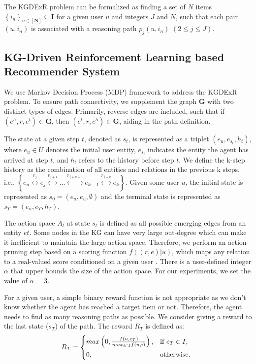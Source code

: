 \documentclass[11pt]{article}
\begin{document}
The KGDExR problem can be formalized as finding a set of $N$ items $\left \{i_{n}\right \}_{n \in [\mathbf{N}]} \subseteq  \mathbf{I}$ for a given user $u$ and integers $J$ and $N$, such that each pair $(u,i_{n})$ is associated with a reasoning path $p_{j}(u,i_{n})$ $(2 \leq j \leq J)$. 

\subsection{KG-Driven Reinforcement Learning based Recommender System}

We use Markov Decision Process (MDP) framework to address the KGDExR problem. To ensure path connectivity, we supplement the graph $\mathbf{G}$ with two distinct types of edges. Primarily, reverse edges are included, such that if $(e^{h},r, e^{t}) \in \mathbf{G}$, then $(e^{t},r, e^{h}) \in \mathbf{G}$, aiding in the path definition.

The state at a given step $t$, denoted as $s_{t}$, is represented as a triplet $(e_{u}, e_{s_{t}}, h_{t})$, where $e_{u} \in U$ denotes the initial user entity, $e_{s_{t}}$ indicates the entity the agent has arrived at step $t$, and $h_{t}$ refers to the history before step $t$. We define the k-step history as the combination of all entities and relations in the previous k steps, i.e., $\left \{ e_{u} \overset{r_{j}}{\leftrightarrow }   e_{j} \overset{r_{j+1}}{\leftrightarrow } . . . \overset{r_{j+k-1}}{\leftrightarrow } e_{k-1} \overset{r_{j+k}}{\leftrightarrow } e_{k} \right \} $. Given some user $u$, the initial state is represented as $s_0 = (e_{u}, e_{u}, \emptyset)$ and the terminal state is represented as  $s_{T} = (e_{u}, e_{T}, h_{T})$.

The action space $A_{t}$ at state $s_{t}$ is defined as all possible emerging edges from an entity $e{t}$.
Some nodes in the KG can have very large out-degree which can make it inefficient to maintain the large action space. Therefore, we perform an action-pruning step based on a scoring function $f((r,e)|u)$, which maps any relation to a real-valued score conditioned on a given user \cite{xian2019reinforcement}. There is a user-defined integer $\alpha$ that upper bounds the size of the action space. For our experiments, we set the value of $\alpha$ = 3.

For a given user, a simple binary reward function is not appropriate as we don't know whether the agent has reached a target item or not. Therefore, the agent needs to find as many reasoning paths as possible. We consider giving a reward to the last state ($s_{T}$) of the path. The reward $R_{T}$ is defined as:
\begin{equation}
R_{T} = \begin{cases*}
  max\left ( 0, \frac{f(u,e_{T})}{max_{i\in I} f(u,i)} \right ), & if $ e_{T}\in I$,\\
  0,                    & otherwise.
\end{cases*}
\end{equation}
\end{document}
